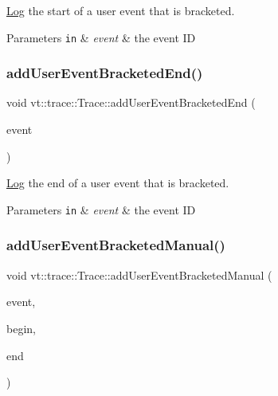\hyperlink{structvt_1_1trace_1_1_log}{Log} the start of a user event that is bracketed. 


\begin{DoxyParams}[1]{Parameters}
\mbox{\tt in}  & {\em event} & the event ID \\
\hline
\end{DoxyParams}
\mbox{\label{structvt_1_1trace_1_1_trace_a9ed44cd0fb5939013ae30de2aeb8aa0e}} 
\subsubsection{\texorpdfstring{add\+User\+Event\+Bracketed\+End()}{addUserEventBracketedEnd()}}
{\footnotesize\ttfamily void vt\+::trace\+::\+Trace\+::add\+User\+Event\+Bracketed\+End (\begin{DoxyParamCaption}\item[{\hyperlink{namespacevt_1_1trace_a5908920d051c144c89f17c69ed262350}{User\+Event\+I\+D\+Type}}]{event }\end{DoxyParamCaption})}



\hyperlink{structvt_1_1trace_1_1_log}{Log} the end of a user event that is bracketed. 


\begin{DoxyParams}[1]{Parameters}
\mbox{\tt in}  & {\em event} & the event ID \\
\hline
\end{DoxyParams}
\mbox{\label{structvt_1_1trace_1_1_trace_ab0dd676ca3870682b0c52669d3603c11}} 
\subsubsection{\texorpdfstring{add\+User\+Event\+Bracketed\+Manual()}{addUserEventBracketedManual()}}
{\footnotesize\ttfamily void vt\+::trace\+::\+Trace\+::add\+User\+Event\+Bracketed\+Manual (\begin{DoxyParamCaption}\item[{\hyperlink{namespacevt_1_1trace_a70c43e0e1596eea236912d4197d3120a}{User\+Spec\+Event\+I\+D\+Type}}]{event,  }\item[{double}]{begin,  }\item[{double}]{end }\end{DoxyParamCaption})}



